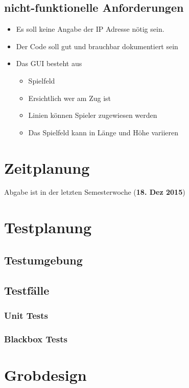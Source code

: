 \documentclass[a4paper, 10pt, fleqn]{article}
\begin{document}
		\subsection{nicht-funktionelle Anforderungen}
			\begin{itemize}
				\item Es soll keine Angabe der IP Adresse nötig sein.
				\item Der Code soll gut und brauchbar dokumentiert sein
				\item Das GUI besteht aus
				\begin{itemize}
					\item Spielfeld
					\item Ersichtlich wer am Zug ist
					\item Linien können Spieler zugewiesen werden
					\item Das Spielfeld kann in Länge und Höhe variieren
				\end{itemize}
			\end{itemize}
	
	\clearpage
	\section{Zeitplanung}
		Abgabe ist in der letzten Semesterwoche (\textbf{18. Dez 2015})
	
	\clearpage
	\section{Testplanung}
		\subsection{Testumgebung}
		
		\subsection{Testfälle}
			 \subsubsection{Unit Tests}
			 
			  \subsubsection{Blackbox Tests}
			  
	\clearpage
	\section{Grobdesign}
\end{document}
